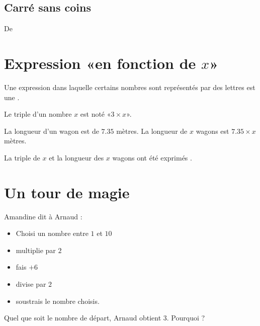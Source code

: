 
\subsection*{Carré sans coins}


De \cite{NRHooXFvgpp5}

\section{Expression «en fonction de \( x\)» }

\begin{definition}
    Une expression dans laquelle certains nombres sont représentés par des lettres est une .
\end{definition}

\begin{example}
    Le triple d'un nombre \( x\) est noté «\( 3\times x\)».
\end{example}

\begin{example}
    La longueur d'un wagon est de \( 7.35\) mètres. La longueur de \( x\) wagons est \( 7.35\times x\) mètres.
\end{example}

La triple de \( x\) et la longueur des \( x\) wagons ont été exprimés .

\section{Un tour de magie}

Amandine dit à Arnaud :
\begin{itemize}
    \item Choisi un nombre entre \( 1\) et \( 10\)
    \item multiplie par \( 2\)
    \item fais \( +6\)
    \item divise par \( 2\)
    \item soustrais le nombre choisis.
\end{itemize}
Quel que soit le nombre de départ, Arnaud obtient \( 3\). Pourquoi ?
